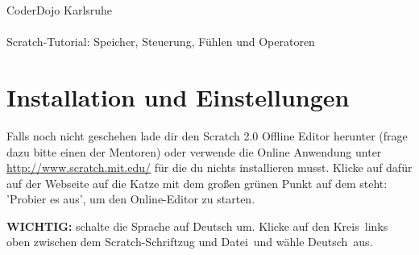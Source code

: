 \documentclass{\VorlagenPfad/coderdojokatext}
\begin{document}
\begin{center}
{\huge CoderDojo Karlsruhe} \\ \ \\ \large{Scratch-Tutorial: Speicher, Steuerung, Fühlen und Operatoren}
\end{center}



\newcommand{\Block}[2]{\textcolor{#1}{'#2'}}
\newcommand{\SFarbe}[2]{\textcolor{#1}{#2}}
\newcommand{\KBew}{\textcolor{Bew}{Bewegung}}
\newcommand{\KAus}{\textcolor{Aus}{Aussehen}}
\newcommand{\KKla}{\textcolor{Kla}{Klang}}
\newcommand{\KMal}{\textcolor{Mal}{Malstift}}
\newcommand{\KSpe}{\textcolor{Spe}{Speicher}}
\newcommand{\KEre}{\textcolor{Ere}{Ereignisse}}
\newcommand{\KSte}{\textcolor{Ste}{Steuerung}}
\newcommand{\KFue}{\textcolor{Fue}{Fühlen}}
\newcommand{\KOpe}{\textcolor{Ope}{Operatoren}}
\newcommand{\KWei}{\textcolor{Wei}{Weitere Blöcke}}



\section{Installation und Einstellungen}
Falls noch nicht geschehen lade dir den Scratch 2.0 Offline Editor herunter (frage dazu bitte einen der Mentoren) oder verwende die Online Anwendung unter  \href{http://www.scratch.mit.edu/}{http://www.scratch.mit.edu/} für die du nichts installieren musst. Klicke auf dafür auf der Webseite auf die Katze mit dem großen grünen Punkt auf dem steht: 'Probier es aus', um den Online-Editor zu starten.


\textbf{WICHTIG:} schalte die Sprache auf Deutsch um. Klicke auf den \glqq Kreis\grqq $\,$ links oben zwischen dem Scratch-Schriftzug und \glqq Datei\grqq $\,$ und wähle  \glqq Deutsch\grqq $\,$ aus. 
\end{document}
